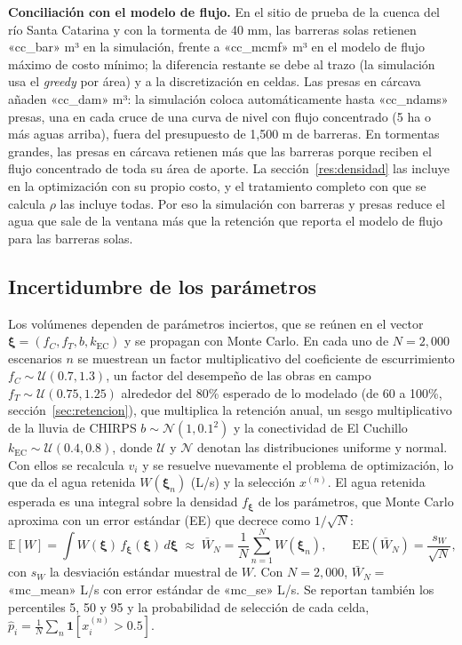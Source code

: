 \textbf{Conciliación con el modelo de flujo.} En el sitio de prueba de la cuenca del río Santa Catarina y con la tormenta de 40 mm, las barreras solas retienen «cc_bar» m³ en la simulación, frente a «cc_mcmf» m³ en el modelo de flujo máximo de costo mínimo; la diferencia restante se debe al trazo (la simulación usa el \emph{greedy} por área) y a la discretización en celdas. Las presas en cárcava añaden «cc_dam» m³: la simulación coloca automáticamente hasta «cc_ndams» presas, una en cada cruce de una curva de nivel con flujo concentrado (5 ha o más aguas arriba), fuera del presupuesto de 1,500 m de barreras. En tormentas grandes, las presas en cárcava retienen más que las barreras porque reciben el flujo concentrado de toda su área de aporte. La sección~\ref{res:densidad} las incluye en la optimización con su propio costo, y el tratamiento completo con que se calcula $\rho$ las incluye todas. Por eso la simulación con barreras y presas reduce el agua que sale de la ventana más que la retención que reporta el modelo de flujo para las barreras solas.

\subsection{Incertidumbre de los parámetros}\label{sec:incertidumbre}

Los volúmenes dependen de parámetros inciertos, que se reúnen en el vector $\boldsymbol\xi=(f_C,f_T,b,k_{\text{EC}})$ y se propagan con Monte Carlo. En cada uno de $N=2{,}000$ escenarios $n$ se muestrean un factor multiplicativo del coeficiente de escurrimiento $f_C\sim\mathcal U(0.7,1.3)$, un factor del desempeño de las obras en campo $f_T\sim\mathcal U(0.75,1.25)$ alrededor del 80\% esperado de lo modelado (de 60 a 100\%, sección~\ref{sec:retencion}), que multiplica la retención anual, un sesgo multiplicativo de la lluvia de CHIRPS $b\sim\mathcal N(1,0.1^2)$ y la conectividad de El Cuchillo $k_{\text{EC}}\sim\mathcal U(0.4,0.8)$, donde $\mathcal U$ y $\mathcal N$ denotan las distribuciones uniforme y normal. Con ellos se recalcula $v_i$ y se resuelve nuevamente el problema de optimización, lo que da el agua retenida $W(\boldsymbol\xi_n)$ (L/s) y la selección $x^{(n)}$. El agua retenida esperada es una integral sobre la densidad $f_{\boldsymbol\xi}$ de los parámetros, que Monte Carlo aproxima con un error estándar (EE) que decrece como $1/\sqrt N$:
\begin{equation}
\mathbb E[W]=\int W(\boldsymbol\xi)\,f_{\boldsymbol\xi}(\boldsymbol\xi)\,d\boldsymbol\xi\;\approx\;\bar W_N=\frac1N\sum_{n=1}^{N}W(\boldsymbol\xi_n),\qquad \text{EE}(\bar W_N)=\frac{s_W}{\sqrt N},
\end{equation}
con $s_W$ la desviación estándar muestral de $W$. Con $N=2{,}000$, $\bar W_N=$ «mc_mean» L/s con error estándar de «mc_se» L/s. Se reportan también los percentiles 5, 50 y 95 y la probabilidad de selección de cada celda, $\hat p_i = \frac1N\sum_n \mathbf 1[x_i^{(n)}>0.5]$.

